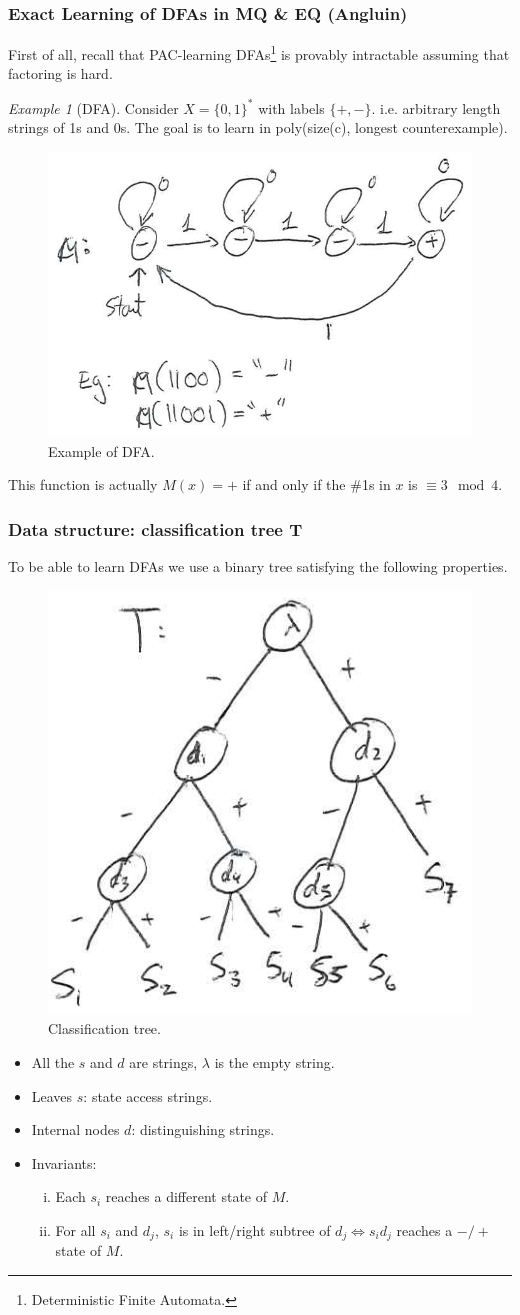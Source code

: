 \documentclass[12pt, letterpaper]{article}
\numberwithin{equation}{section} %
\theoremstyle{definition}
\theoremstyle{remark}
\newtheorem{example}[theorem]{Example}
\begin{document}
\subsubsection{Exact Learning of DFAs in MQ \& EQ (Angluin)}
First of all, recall that PAC-learning DFAs\footnote{Deterministic Finite Automata.}  is provably intractable assuming that factoring is hard.
\begin{example}[DFA]
Consider $X=\lbrace 0, 1\rbrace^*$ with labels $\lbrace +, -\rbrace$. i.e. arbitrary length strings of 1s and 0s. The goal is to learn in poly(size(c), longest counterexample).
\begin{figure}[H]
\centering
\includegraphics[width=0.6\linewidth]{../img/dfa.png}
\caption{Example of DFA.}
\end{figure}
This function is actually $M(x) = +$ if and only if the \#1s in $x$ is $\equiv 3 \mod 4$.
\end{example}

\subsubsection*{Data structure: classification tree T}
To be able to learn DFAs we use a binary tree satisfying the following properties.
\begin{figure}[H]
\centering
\includegraphics[width=0.3\linewidth]{../img/dfa-tree.png}
\caption{Classification tree.}
\end{figure}
\begin{itemize}
\item All the $s$ and $d$ are strings, $\lambda$ is the empty string.
\item Leaves $s$: state access strings.
\item Internal nodes $d$: distinguishing strings.
\item Invariants:
    \begin{enumerate}[i)]
    \item Each $s_i$ reaches a different state of $M$.
    \item For all $s_i$ and $d_j$, $s_i$ is in left/right subtree of $d_j \iff s_id_j$ reaches a $-/+$ state of $M$.
    \end{enumerate}
\end{itemize}
\end{document}
